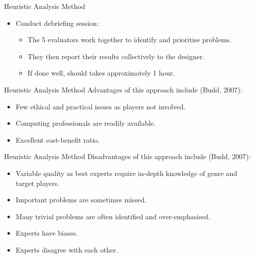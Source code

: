 \begin{frame}{Heuristic Analysis Method}
	\begin{itemize}
		\item Conduct debriefing session:
			\begin{itemize}
				\item The 5 evaluators work together to identify and prioritise problems.
				\item They then report their results collectively to the designer.
				\item If done well, should takes approximately 1 hour.
			\end{itemize}
	\end{itemize}
\end{frame}

\begin{frame}{Heuristic Analysis Method}
Advantages of this approach include (Budd, 2007):

	\begin{itemize}
		\item Few ethical and practical issues as players not involved.
		\item Computing professionals are readily available.
		\item Excellent cost-benefit ratio.
	\end{itemize}
\end{frame}

\begin{frame}{Heuristic Analysis Method}
Disadvantages of this approach include (Budd, 2007):

	\begin{itemize}
		\item Variable quality as best experts require in-depth knowledge of genre and target players.
		\item Important problems are sometimes missed.
		\item Many trivial problems are often identified and over-emphasised.
		\item Experts have biases.
		\item Experts disagree with each other.
	\end{itemize}
\end{frame}